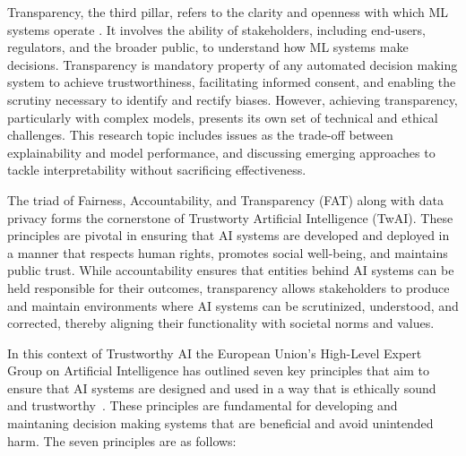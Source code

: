 Transparency, the third pillar, refers to the clarity and openness with which ML systems operate \citep{Burkart2021}. It involves the ability of stakeholders, including end-users, regulators, and the broader public, to understand how ML systems make decisions. Transparency is mandatory property of any automated decision making system to achieve trustworthiness, facilitating informed consent, and enabling the scrutiny necessary to identify and rectify biases. However, achieving transparency, particularly with complex models, presents its own set of technical and ethical challenges. This research topic includes issues as the trade-off between explainability and model performance, and discussing emerging approaches to tackle interpretability without sacrificing effectiveness.

The triad of Fairness, Accountability, and Transparency (FAT) along with data privacy forms the cornerstone of Trustworty Artificial Intelligence (TwAI). These principles are pivotal in ensuring that AI systems are developed and deployed in a manner that respects human rights, promotes social well-being, and maintains public trust. While accountability ensures that entities behind AI systems can be held responsible for their outcomes, transparency allows stakeholders to produce and maintain environments where AI systems can be scrutinized, understood, and corrected, thereby aligning their functionality with societal norms and values.

In this context of Trustworthy AI the European Union's High-Level Expert Group on Artificial Intelligence has outlined seven key principles that aim to ensure that AI systems are designed and used in a way that is ethically sound and trustworthy~\citep{TwAI_Europe}. These principles are fundamental for developing and maintaning decision making systems that are beneficial and avoid unintended harm. The seven principles are as follows:

